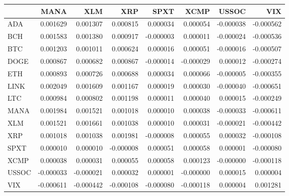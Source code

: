 \begin{tabular}{lrrrrrrr}
\toprule
 & MANA & XLM & XRP & SPXT & XCMP & USSOC & VIX \\
\midrule
ADA & 0.001629 & 0.001307 & 0.000815 & 0.000034 & 0.000054 & -0.000038 & -0.000562 \\
BCH & 0.001583 & 0.001380 & 0.000917 & -0.000003 & 0.000011 & -0.000024 & -0.000536 \\
BTC & 0.001203 & 0.001011 & 0.000624 & 0.000016 & 0.000051 & -0.000016 & -0.000507 \\
DOGE & 0.000867 & 0.000682 & 0.000867 & -0.000014 & -0.000029 & 0.000012 & -0.000274 \\
ETH & 0.000893 & 0.000726 & 0.000688 & 0.000034 & 0.000066 & -0.000005 & -0.000355 \\
LINK & 0.002049 & 0.001609 & 0.001167 & 0.000019 & 0.000030 & -0.000040 & -0.000651 \\
LTC & 0.000984 & 0.000802 & 0.001198 & 0.000011 & 0.000040 & 0.000015 & -0.000249 \\
MANA & 0.001984 & 0.001521 & 0.001018 & 0.000010 & 0.000038 & -0.000033 & -0.000611 \\
XLM & 0.001521 & 0.001661 & 0.001038 & 0.000010 & 0.000031 & -0.000021 & -0.000442 \\
XRP & 0.001018 & 0.001038 & 0.001981 & -0.000008 & 0.000055 & 0.000032 & -0.000108 \\
SPXT & 0.000010 & 0.000010 & -0.000008 & 0.000051 & 0.000058 & 0.000001 & -0.000080 \\
XCMP & 0.000038 & 0.000031 & 0.000055 & 0.000058 & 0.000123 & -0.000000 & -0.000118 \\
USSOC & -0.000033 & -0.000021 & 0.000032 & 0.000001 & -0.000000 & 0.000015 & 0.000004 \\
VIX & -0.000611 & -0.000442 & -0.000108 & -0.000080 & -0.000118 & 0.000004 & 0.001281 \\
\bottomrule
\end{tabular}
